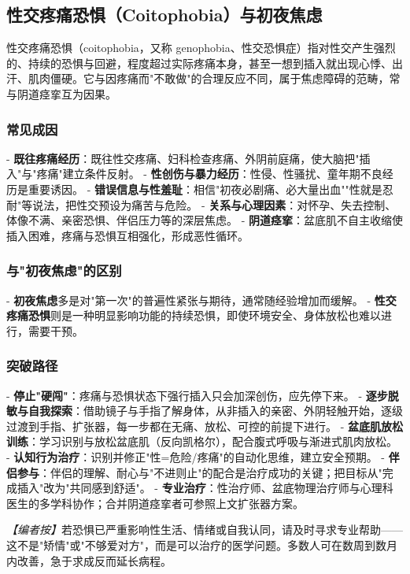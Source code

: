 \subsection{性交疼痛恐惧（Coitophobia）与初夜焦虑}

性交疼痛恐惧（coitophobia，又称 genophobia、性交恐惧症）指对性交产生强烈的、持续的恐惧与回避，程度超过实际疼痛本身，甚至一想到插入就出现心悸、出汗、肌肉僵硬。它与因疼痛而"不敢做"的合理反应不同，属于焦虑障碍的范畴，常与阴道痉挛互为因果。

\subsubsection{常见成因}

- \textbf{既往疼痛经历}：既往性交疼痛、妇科检查疼痛、外阴前庭痛，使大脑把"插入"与"疼痛"建立条件反射。
- \textbf{性创伤与暴力经历}：性侵、性骚扰、童年期不良经历是重要诱因。
- \textbf{错误信息与性羞耻}：相信"初夜必剧痛、必大量出血""性就是忍耐"等说法，把性交预设为痛苦与危险。
- \textbf{关系与心理因素}：对怀孕、失去控制、体像不满、亲密恐惧、伴侣压力等的深层焦虑。
- \textbf{阴道痉挛}：盆底肌不自主收缩使插入困难，疼痛与恐惧互相强化，形成恶性循环。

\subsubsection{与"初夜焦虑"的区别}

- \textbf{初夜焦虑}多是对"第一次"的普遍性紧张与期待，通常随经验增加而缓解。
- \textbf{性交疼痛恐惧}则是一种明显影响功能的持续恐惧，即使环境安全、身体放松也难以进行，需要干预。

\subsubsection{突破路径}

- \textbf{停止"硬闯"}：疼痛与恐惧状态下强行插入只会加深创伤，应先停下来。
- \textbf{逐步脱敏与自我探索}：借助镜子与手指了解身体，从非插入的亲密、外阴轻触开始，逐级过渡到手指、扩张器，每一步都在无痛、放松、可控的前提下进行。
- \textbf{盆底肌放松训练}：学习识别与放松盆底肌（反向凯格尔），配合腹式呼吸与渐进式肌肉放松。
- \textbf{认知行为治疗}：识别并修正"性=危险/疼痛"的自动化思维，建立安全预期。
- \textbf{伴侣参与}：伴侣的理解、耐心与"不进则止"的配合是治疗成功的关键；把目标从"完成插入"改为"共同感到舒适"。
- \textbf{专业治疗}：性治疗师、盆底物理治疗师与心理科医生的多学科协作；合并阴道痉挛者可参照上文扩张器方案。

\noindent\textit{【编者按】}若恐惧已严重影响性生活、情绪或自我认同，请及时寻求专业帮助——这不是"矫情"或"不够爱对方"，而是可以治疗的医学问题。多数人可在数周到数月内改善，急于求成反而延长病程。
